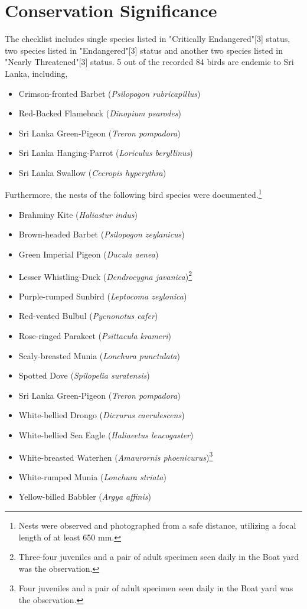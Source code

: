 \section{Conservation Significance}
The checklist includes single species listed in "Critically Endangered"[3] status, two species listed in "Endangered"[3] status  and another two species listed in "Nearly Threatened"[3] status. 5 out of the recorded 84 birds are endemic to Sri Lanka, including,
\begin{itemize}
\item Crimson-fronted Barbet (\textit{Psilopogon rubricapillus})
\item Red{-}Backed Flameback (\textit{Dinopium psarodes})
\item Sri Lanka Green-Pigeon (\textit{Treron pompadora})
 \item Sri Lanka Hanging-Parrot (\textit{Loriculus beryllinus})
   \item Sri Lanka Swallow (\textit{Cecropis hyperythra})
\end{itemize}
Furthermore, the nests of the following bird species were documented.\footnote{Nests were observed and photographed from a safe distance, utilizing a focal length of at least 650 mm.}
\begin{itemize}
\item Brahminy Kite (\textit{Haliastur indus})
\item Brown-headed Barbet (\textit{Psilopogon zeylanicus})
\item Green Imperial Pigeon (\textit{Ducula aenea})
\item Lesser Whistling{-}Duck (\textit{Dendrocygna javanica})\footnote{Three-four juveniles and a pair of adult specimen seen daily in the Boat yard was the observation.}
\item Purple-rumped Sunbird (\textit{Leptocoma zeylonica})
\item Red-vented Bulbul (\textit{Pycnonotus cafer})
\item Rose-ringed Parakeet (\textit{Psittacula krameri})
\item Scaly-breasted Munia (\textit{Lonchura punctulata})
\item Spotted Dove (\textit{Spilopelia suratensis})
\item Sri Lanka Green-Pigeon (\textit{Treron pompadora})
\item White-bellied Drongo (\textit{Dicrurus caerulescens})
\item White-bellied Sea Eagle (\textit{Haliaeetus leucogaster})
\item White-breasted Waterhen (\textit{Amaurornis phoenicurus})\footnote{Four juveniles and a pair of adult specimen seen daily in the Boat yard was the observation.}
\item White-rumped Munia (\textit{Lonchura striata})
\item Yellow-billed Babbler (\textit{Argya affinis})
\end{itemize}
